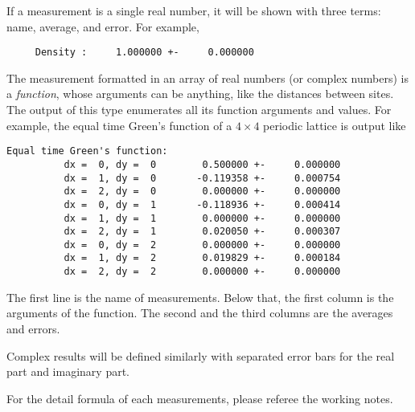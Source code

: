 \documentclass[12pt]{article}
\begin{document}
If a measurement is a single real number, it will be shown with three terms: name, average, and error. For example,
\begin{verbatim}
     Density :     1.000000 +-     0.000000
\end{verbatim}

The measurement formatted in an array of real numbers (or complex numbers) is a \emph{function}, whose arguments can be anything, like the distances between sites.
The output of this type enumerates all its function arguments and values. For example, the equal time Green's function of a $4\times 4$ periodic lattice is output like
\begin{verbatim}
Equal time Green's function:
          dx =  0, dy =  0        0.500000 +-     0.000000
          dx =  1, dy =  0       -0.119358 +-     0.000754
          dx =  2, dy =  0        0.000000 +-     0.000000
          dx =  0, dy =  1       -0.118936 +-     0.000414
          dx =  1, dy =  1        0.000000 +-     0.000000
          dx =  2, dy =  1        0.020050 +-     0.000307
          dx =  0, dy =  2        0.000000 +-     0.000000
          dx =  1, dy =  2        0.019829 +-     0.000184
          dx =  2, dy =  2        0.000000 +-     0.000000
\end{verbatim}
The first line is the name of measurements. Below that,
the first column is the arguments of the function. The second and the third columns are the averages and errors.

Complex results will be defined similarly with separated error bars for the real part and imaginary part.

For the detail formula of each measurements, please referee the working notes.
\end{document}

